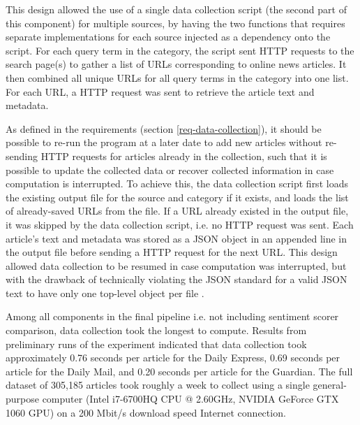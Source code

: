 \documentclass{report}
\begin{document}
This design allowed the use of a single data collection script (the second part of this component) for multiple sources, by having the two functions that requires separate implementations for each source injected as a dependency onto the script.
For each query term in the category, the script sent HTTP requests to the search page(s) to gather a list of URLs corresponding to online news articles.
It then combined all unique URLs for all query terms in the category into one list.
For each URL, a HTTP request was sent to retrieve the article text and metadata.

As defined in the requirements (section \ref{req-data-collection}), it should be possible to re-run the program at a later date to add new articles without re-sending HTTP requests for articles already in the collection, such that it is possible to update the collected data or recover collected information in case computation is interrupted.
To achieve this, the data collection script first loads the existing output file for the source and category if it exists, and loads the list of already-saved URLs from the file.
If a URL already existed in the output file, it was skipped by the data collection script, i.e. no HTTP request was sent.
Each article's text and metadata was stored as a JSON object in an appended line in the output file before sending a HTTP request for the next URL.
This design allowed data collection to be resumed in case computation was interrupted, but with the drawback of technically violating the JSON standard for a valid JSON text to have only one top-level object per file \cite{rfc8259}.

Among all components in the final pipeline i.e. not including sentiment scorer comparison, data collection took the longest to compute.
Results from preliminary runs of the experiment indicated that data collection took approximately 0.76 seconds per article for the Daily Express, 0.69 seconds per article for the Daily Mail, and 0.20 seconds per article for the Guardian.
The full dataset of 305,185 articles took roughly a week to collect using a single general-purpose computer (Intel i7-6700HQ CPU @ 2.60GHz, NVIDIA GeForce GTX 1060 GPU) on a 200 Mbit/s download speed Internet connection.
\end{document}
